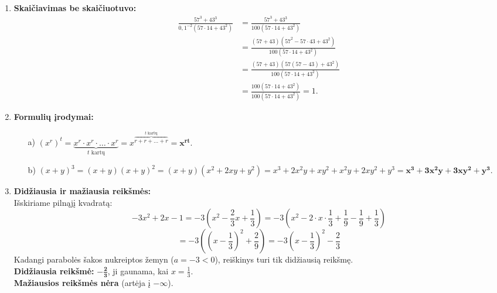 \documentclass[12pt,a4paper]{article}
\begin{document}
\begin{enumerate}
    \vspace{0.3cm}
    \item \textbf{Skaičiavimas be skaičiuotuvo:} \\
    \begin{align*}
        \frac{57^3+43^3}
        {0,1^{-2}\left(57\cdot14+43^2\right)}
        &= \frac{57^3+43^3}
        {100\left(57\cdot14+43^2\right)} \\
        &= \frac{(57+43)\left(57^2-57\cdot43+43^2\right)}
        {100\left(57\cdot14+43^2\right)} \\
        &= \frac{(57+43)\left(57(57-43)+43^2\right)}
        {100\left(57\cdot14+43^2\right)} \\
        &= \frac{100\left(57\cdot14+43^2\right)}
        {100\left(57\cdot14+43^2\right)} = 1.
    \end{align*}

    \vspace{0.3cm}
    \item \textbf{Formulių įrodymai:}
    \begin{itemize}
        \item[a)] $(x^r)^t = \underbrace{x^r \cdot x^r \cdot \dots \cdot x^r}_{t \text{ kartų}} = x^{\overbrace{r + r + \dots + r}^{t \text{ kartų}}} = \mathbf{x^{rt}}.$
        \item[b)] $(x+y)^3 = (x+y)(x+y)^2 = (x+y)(x^2 + 2xy + y^2) = x^3 + 2x^2y + xy^2 + x^2y + 2xy^2 + y^3 = \mathbf{x^3 + 3x^2y + 3xy^2 + y^3}.$
    \end{itemize}

    \vspace{0.3cm}
    \item \textbf{Didžiausia ir mažiausia reikšmės:} \\
    Išskiriame pilnąjį kvadratą:
    $$ -3x^2 + 2x - 1 = -3\left(x^2 - \frac{2}{3}x + \frac{1}{3}\right) = -3\left(x^2 - 2 \cdot x \cdot \frac{1}{3} + \frac{1}{9} - \frac{1}{9} + \frac{1}{3}\right) $$
    $$ = -3\left(\left(x - \frac{1}{3}\right)^2 + \frac{2}{9}\right) = -3\left(x - \frac{1}{3}\right)^2 - \frac{2}{3} $$
    Kadangi parabolės šakos nukreiptos žemyn ($a = -3 < 0$), reiškinys turi tik didžiausią reikšmę. \\
    \textbf{Didžiausia reikšmė:} $\mathbf{-\frac{2}{3}}$, ji gaunama, kai $x = \frac{1}{3}$. \\
    \textbf{Mažiausios reikšmės nėra} (artėja į $-\infty$).


\end{enumerate}
\end{document}

